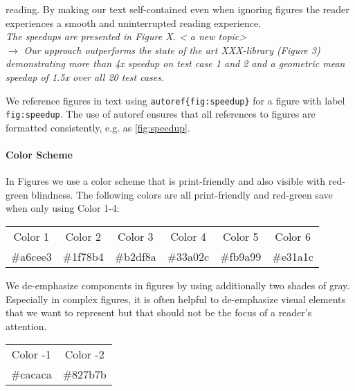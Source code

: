 \documentclass[review, anonymous, acmsmall]{acmart}
\newenvironment{draftonly}{}{}
\begin{document}
\begin{draftonly}
\begin{description}
		reading.  By making
		our text self-contained even when ignoring figures the reader
		experiences a smooth and uninterrupted reading experience.\\
		{\color{pairedTwoDarkBlue}
		\textit{The speedups are presented in Figure X. < a new topic> }}\\
		$\to$ {\color{pairedFourDarkGreen}\textit{Our approach outperforms the state of the art
		XXX-library (Figure 3) demonstrating more than 4x speedup on
		test case 1 and 2 and a geometric mean speedup of 1.5x over all
		20 test cases.}}
\end{description}
We reference figures in text using
\texttt{autoref\{fig:speedup\}} for a figure with label
\texttt{fig:speedup}.  The use of autoref ensures that all references
to figures are formatted consistently, e.g. as \autoref{fig:speedup}.

\paragraph{Color Scheme}

In Figures we use a color scheme that is print-friendly and also visible
with red-green blindness. The following colors are all print-friendly
and red-green save when only using Color 1-4:

\medskip
{
	\small
{}

\begin{tabular}{a b d e f g}
Color 1 & Color 2 & Color 3 & Color 4 & Color 5 & Color 6\\
\#a6cee3 & \#1f78b4 & \#b2df8a & \#33a02c & \#fb9a99 & \#e31a1c
\end{tabular}
}

We de-emphasize components in figures by using additionally two shades of gray.
Especially in complex figures, it is often helpful to de-emphasize visual
elements that we want to represent but that should not be the focus of a
reader's attention.

\medskip
{
	\small
{}

\begin{tabular}{h i}
Color -1 & Color -2\\
\#cacaca & \#827b7b\\
\end{tabular}
}


\end{draftonly}
\end{document}
